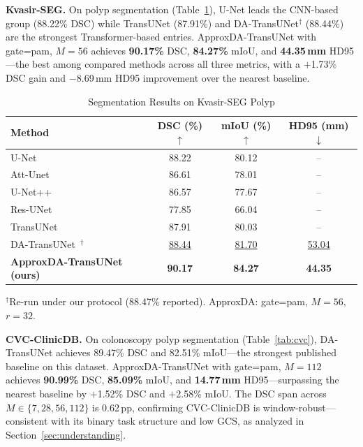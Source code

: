 \textbf{Kvasir-SEG.} On polyp segmentation (Table~\ref{tab:kvasir}), U-Net leads the CNN-based group (88.22\% DSC) while TransUNet (87.91\%) and DA-TransUNet$^\dag$ (88.44\%) are the strongest Transformer-based entries. ApproxDA-TransUNet with gate=pam, $M{=}56$ achieves \textbf{90.17\%} DSC, \textbf{84.27\%} mIoU, and \textbf{44.35\,mm} HD95---the best among compared methods across all three metrics, with a $+$1.73\% DSC gain and $-$8.69\,mm HD95 improvement over the nearest baseline.

\begin{table}[ht]
  \caption{Segmentation Results on Kvasir-SEG Polyp}
  \label{tab:kvasir}
  \centering
  \setlength{\tabcolsep}{3pt}
  \begin{tabular}{lccc}
    \toprule
    Method & DSC (\%) $\uparrow$ & mIoU (\%) $\uparrow$ & HD95 (mm) $\downarrow$ \\
    \midrule
    U-Net~\cite{ronneberger2015unet}           & 88.22 & 80.12 & -- \\
    Att-Unet~\cite{oktay2018attention}         & 86.61 & 78.01 & -- \\
    U-Net++~\cite{zhou2018unetpp}              & 86.57 & 77.67 & -- \\
    Res-UNet~\cite{diakogiannis2020resunet}    & 77.85 & 66.04 & -- \\
    TransUNet~\cite{chen2021transunet}         & 87.91 & 80.03 & -- \\
    DA-TransUNet~\cite{sun2024datransunet}$^\dag$ & \underline{88.44} & \underline{81.70} & \underline{53.04} \\
    \midrule
    \textbf{ApproxDA-TransUNet (ours)}         & \textbf{90.17} & \textbf{84.27} & \textbf{44.35} \\
    \bottomrule
  \end{tabular}
  \par\vspace{5pt}
  \parbox{\columnwidth}{\footnotesize $^\dag$Re-run under our protocol (88.47\% reported). ApproxDA: gate=pam, $M{=}56$, $r{=}32$.}
\end{table}

\textbf{CVC-ClinicDB.} On colonoscopy polyp segmentation (Table~\ref{tab:cvc}), DA-TransUNet achieves 89.47\% DSC and 82.51\% mIoU---the strongest published baseline on this dataset. ApproxDA-TransUNet with gate=pam, $M{=}112$ achieves \textbf{90.99\%} DSC, \textbf{85.09\%} mIoU, and \textbf{14.77\,mm} HD95---surpassing the nearest baseline by $+$1.52\% DSC and $+$2.58\% mIoU. The DSC span across $M{\in}\{7,28,56,112\}$ is 0.62\,pp, confirming CVC-ClinicDB is window-robust---consistent with its binary task structure and low GCS, as analyzed in Section~\ref{sec:understanding}.

